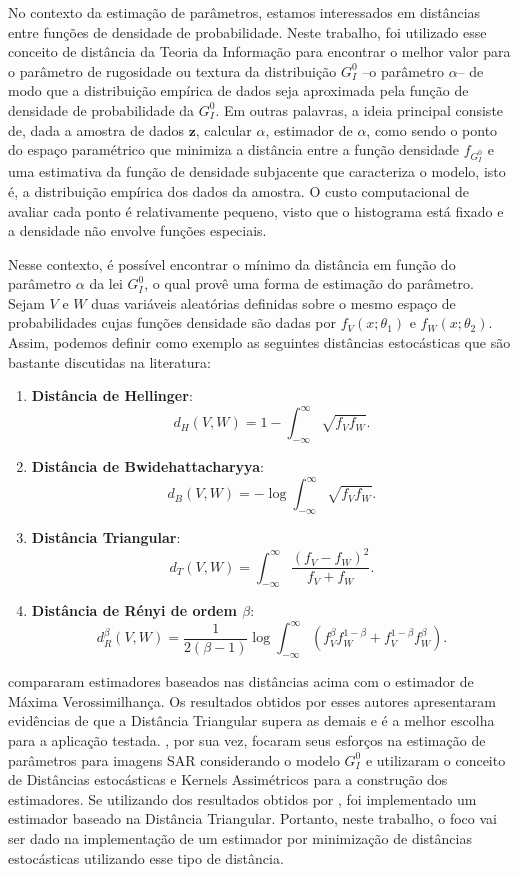 No contexto da estimação de parâmetros, estamos interessados em distâncias entre funções de densidade de probabilidade. 
Neste trabalho, foi utilizado esse conceito de distância da Teoria da Informação para encontrar o melhor valor para o parâmetro de rugosidade ou textura da distribuição $G_I^0$ --o parâmetro $\alpha$-- de modo que a distribuição empírica de dados seja aproximada pela função de densidade de probabilidade da $G_I^0$. 
Em outras palavras, a ideia principal consiste de, dada a amostra de dados $\bm z$, calcular $\widehat{\alpha}$, estimador de $\alpha$, como sendo o ponto do espaço paramétrico que minimiza a distância entre a função densidade $f_{G_I^0}$ e uma estimativa da função de densidade subjacente que caracteriza o modelo, isto é, a distribuição empírica dos dados da amostra. 
O custo computacional de avaliar cada ponto é relativamente pequeno, visto que o histograma está fixado e a densidade não envolve funções especiais. 

Nesse contexto, é possível encontrar o mínimo da distância em função do parâmetro $\alpha$ da lei $G_I^0$, o qual provê uma forma de estimação do parâmetro. 
Sejam $V$ e $W$ duas variáveis aleatórias definidas sobre o mesmo espaço de probabilidades cujas funções densidade são dadas por $f_V(x; \theta_1)$ e $f_W(x; \theta_2)$. 
Assim, podemos definir como exemplo as seguintes distâncias estocásticas que são bastante discutidas na literatura:
\begin{enumerate}
    \item \textbf{Distância de Hellinger}: $$ d_H(V,W) = 1 - \int_{-\infty}^{\infty}\sqrt{f_V f_W}.$$
    \item \textbf{Distância de Bwidehattacharyya}: $$d_B(V,W) = -\log\int_{-\infty}^{\infty}\sqrt{f_V f_W}.$$
    \item\textbf{Distância Triangular}: $$d_T(V,W) = \int_{-\infty}^{\infty}\dfrac{(f_V - f_W)^2}{f_V + f_W}.$$
    \item \textbf{Distância de Rényi de ordem $\beta$}: $$d_R^\beta(V,W) = \dfrac{1}{2(\beta-1)}\log\int_{-\infty}^{\infty}(f_V^{\beta}f_W^{1-\beta} + f_V^{1-\beta}f_W^{\beta}).$$
\end{enumerate}

\citet{Cassetti2013} compararam estimadores baseados nas distâncias acima com o estimador de Máxima Verossimilhança. Os resultados obtidos por esses autores apresentaram evidências de que a Distância Triangular supera as demais e é a melhor escolha para a aplicação testada. 
\citet{FreryStochasticDistances2015}, por sua vez, focaram seus esforços na estimação de parâmetros para imagens SAR considerando o modelo $G_I^0$ e utilizaram o conceito de Distâncias estocásticas e Kernels Assimétricos para a construção dos estimadores. 
Se utilizando dos resultados obtidos por \citet{Cassetti2013}, foi implementado um estimador baseado na Distância Triangular. 
Portanto, neste trabalho, o foco vai ser dado na implementação de um estimador por minimização de distâncias estocásticas utilizando esse tipo de distância.

